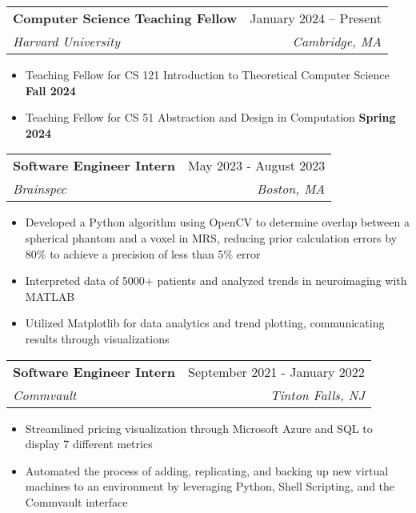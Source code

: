\documentclass[letterpaper,11pt]{article}
\makeatletter
\newcommand{\resumeItem}[1]{
  \item\small{
    {#1 \vspace{-2pt}}
  }
}
\newcommand{\resumeSubheading}[4]{
  \vspace{-2pt}\item
    \begin{tabular*}{0.97\textwidth}[t]{l@{\extracolsep{\fill}}r}
      \textbf{#1} & #2 \\
      \textit{\small#3} & \textit{\small #4} \\
    \end{tabular*}\vspace{-7pt}
}
\newcommand{\resumeSubSubheading}[2]{
    \item
    \begin{tabular*}{0.97\textwidth}{l@{\extracolsep{\fill}}r}
      \textit{\small#1} & \textit{\small #2} \\
    \end{tabular*}\vspace{-7pt}
}
\newcommand{\resumeSubHeadingListEnd}{\end{itemize}}
\newcommand{\resumeItemListStart}{\begin{itemize}}
\newcommand{\resumeItemListEnd}{\end{itemize}\vspace{-5pt}}
\makeatother
\begin{document}
    \resumeSubheading
      {Computer Science Teaching Fellow}{January 2024 -- Present}
      {Harvard University}{Cambridge, MA}
      \resumeItemListStart
        \resumeItem{Teaching Fellow for CS 121 Introduction to Theoretical Computer Science \textbf{Fall 2024}}
        \resumeItem{Teaching Fellow for CS 51 Abstraction and Design in Computation \textbf{Spring 2024}}
      \resumeItemListEnd
      



    \resumeSubheading
      {Software Engineer Intern}{May 2023 - August 2023}
      {Brainspec}{Boston, MA}
      \resumeItemListStart
        \resumeItem{Developed a Python algorithm using OpenCV to determine overlap between a spherical phantom and a voxel in MRS, reducing prior calculation errors by 80$\%$ to achieve a precision of less than 5$\%$ error}
        \resumeItem{Interpreted data of 5000+ patients and analyzed trends in neuroimaging with MATLAB}
        \resumeItem{Utilized Matplotlib for data analytics and trend plotting, communicating results through visualizations}
      \resumeItemListEnd

      \resumeSubheading
      {Software Engineer Intern}{September 2021 - January 2022}
      {Commvault}{Tinton Falls, NJ}
      \resumeItemListStart
        \resumeItem{Streamlined pricing visualization through Microsoft Azure and SQL to display 7 different metrics}
        \resumeItem{Automated the process of adding, replicating, and backing up new virtual machines to an environment by leveraging Python, Shell Scripting, and the Commvault interface}
      \resumeItemListEnd
\end{document}
